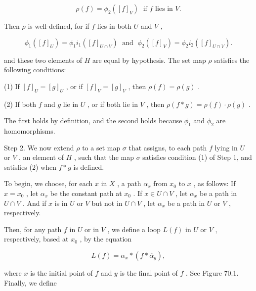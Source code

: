 \documentclass[10pt]{article}
\begin{document}
\[
\rho \left( f\right)  = {\phi }_{2}\left( {\left\lbrack  f\right\rbrack  }_{V}\right) \;\text{ if }f\text{ lies in }V.
\]

Then \(\rho\) is well-defined, for if \(f\) lies in both \(U\) and \(V\) ,

\[
{\phi }_{1}\left( {\left\lbrack  f\right\rbrack  }_{U}\right)  = {\phi }_{1}{i}_{1}\left( {\left\lbrack  f\right\rbrack  }_{U \cap  V}\right) \;\text{ and }\;{\phi }_{2}\left( {\left\lbrack  f\right\rbrack  }_{V}\right)  = {\phi }_{2}{i}_{2}\left( {\left\lbrack  f\right\rbrack  }_{U \cap  V}\right) .
\]

and these two elements of \(H\) are equal by hypothesis. The set map \(\rho\) satisfies the following conditions:

(1) If \({\left\lbrack  f\right\rbrack  }_{U} = {\left\lbrack  g\right\rbrack  }_{U}\) , or if \({\left\lbrack  f\right\rbrack  }_{V} = {\left\lbrack  g\right\rbrack  }_{V}\) , then \(\rho \left( f\right)  = \rho \left( g\right)\) .

(2) If both \(f\) and \(g\) lie in \(U\) , or if both lie in \(V\) , then \(\rho \left( {f * g}\right)  = \rho \left( f\right)  \cdot  \rho \left( g\right)\) .

The first holds by definition, and the second holds because \({\phi }_{1}\) and \({\phi }_{2}\) are homomorphisms.

Step 2. We now extend \(\rho\) to a set map \(\sigma\) that assigns, to each path \(f\) lying in \(U\) or \(V\) , an element of \(H\) , such that the map \(\sigma\) satisfies condition (1) of Step 1, and satisfies (2) when \(f * g\) is defined.

To begin, we choose, for each \(x\) in \(X\) , a path \({\alpha }_{x}\) from \({x}_{0}\) to \(x\) , as follows: If \(x = {x}_{0}\) , let \({\alpha }_{x}\) be the constant path at \({x}_{0}\) . If \(x \in  U \cap  V\) , let \({\alpha }_{x}\) be a path in \(U \cap  V\) . And if \(x\) is in \(U\) or \(V\) but not in \(U \cap  V\) , let \({\alpha }_{x}\) be a path in \(U\) or \(V\) , respectively.

Then, for any path \(f\) in \(U\) or in \(V\) , we define a loop \(L\left( f\right)\) in \(U\) or \(V\) , respectively, based at \({x}_{0}\) , by the equation

\[
L\left( f\right)  = {\alpha }_{x} * \left( {f * {\overline{\alpha }}_{y}}\right) ,
\]

where \(x\) is the initial point of \(f\) and \(y\) is the final point of \(f\) . See Figure 70.1. Finally, we define
\end{document}
